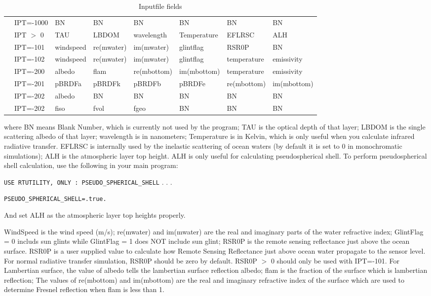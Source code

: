 \documentclass[10pt,letterpaper]{article}
\begin{document}
\begin{table}
\caption{Inputfile fields}
\vspace{0.2 in}
\centering
\begin{tabular}{llllllll}
&IPT=-1000 & BN&BN&BN& BN&BN&BN \\
&IPT $>$ 0 &TAU&LBDOM&wavelength&Temperature&EFLRSC&ALH \\
&IPT=-101  & windspeed & re(mwater) & im(mwater) & glintflag & RSR0P & BN \\
&IPT=-102 & windspeed& re(mwater)& im(mwater)&glintflag&temperature&emissivity \\
&IPT=-200 & albedo &flam&re(mbottom)&im(mbottom)&temperature&emissivity \\
&IPT=-201 & pBRDFa&pBRDFk&pBRDFb&pBRDFe&re(mbottom)&im(mbottom) \\
&IPT=-202  & albedo& BN& BN& BN& BN& BN \\
&IPT=-202  & fiso &fvol & fgeo & BN & BN& BN \\
\end{tabular}
\label{tab:InputFile}
\end{table}
where BN means Blank Number, which is currently not used by the program; TAU is the optical depth of that layer; LBDOM is the single scattering albedo of that layer; wavelength is in nanometers; Temperature is in Kelvin, which is only useful when you calculate infrared radiative transfer. EFLRSC is internally used by the inelastic scattering of ocean waters (by default it is set to 0 in monochromatic simulations); ALH is the atmospheric layer top height. ALH is only useful for calculating pseudospherical shell. To perform pseudospherical shell calculation, use the following in your main program:


\verb!USE RTUTILITY, ONLY : PSEUDO_SPHERICAL_SHELL!
.
.
.

\verb!PSEUDO_SPHERICAL_SHELL=.true.!

And set ALH as the atmospheric layer top heights properly.

WindSpeed is the wind speed (m/s); re(mwater) and im(mwater) are the real and imaginary parts of the water refractive index; GlintFlag = 0 includs sun glints while  GlintFlag = 1 does NOT include sun glint; RSR0P is the remote sensing reflectance just above the ocean surface. RSR0P is a user supplied value to calculate how Remote Sensing Reflectance just above ocean water propagate to the sensor level. For normal radiative transfer simulation, RSR0P should be zero by default. RSR0P $>$ 0 should only be used with IPT=-101. 
For Lambertian surface, the value of  albedo tells the lambertian surface reflection albedo;  flam is the fraction of the surface which is lambertian reflection; The values of re(mbottom) and im(mbottom) are the real and imaginary refractive index of the surface which are used to determine Fresnel reflection when flam is less than 1. 
\end{document}
